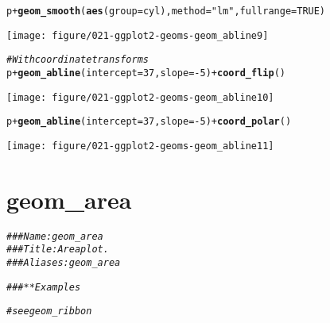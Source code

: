 \documentclass[a4paper,titlepage]{tufte-handout}\usepackage[]{graphicx}\usepackage[]{color}
\makeatletter
\def\maxwidth{ %
  \ifdim\Gin@nat@width>\linewidth
    \linewidth
  \else
    \Gin@nat@width
  \fi
}
\newcommand{\hlnum}[1]{\textcolor[rgb]{0.686,0.059,0.569}{#1}}%
\newcommand{\hlstr}[1]{\textcolor[rgb]{0.192,0.494,0.8}{#1}}%
\newcommand{\hlcom}[1]{\textcolor[rgb]{0.678,0.584,0.686}{\textit{#1}}}%
\newcommand{\hlopt}[1]{\textcolor[rgb]{0,0,0}{#1}}%
\newcommand{\hlstd}[1]{\textcolor[rgb]{0.345,0.345,0.345}{#1}}%
\newcommand{\hlkwc}[1]{\textcolor[rgb]{0.333,0.667,0.333}{#1}}%
\newcommand{\hlkwd}[1]{\textcolor[rgb]{0.737,0.353,0.396}{\textbf{#1}}}%
\newenvironment{kframe}{%
 \def\at@end@of@kframe{}%
 \ifinner\ifhmode%
  \def\at@end@of@kframe{\end{minipage}}%
  \begin{minipage}{\columnwidth}%
 \fi\fi%
 \def\FrameCommand##1{\hskip\@totalleftmargin \hskip-\fboxsep
 \colorbox{shadecolor}{##1}\hskip-\fboxsep
     \hskip-\linewidth \hskip-\@totalleftmargin \hskip\columnwidth}%
 \MakeFramed {\advance\hsize-\width
   \@totalleftmargin\z@ \linewidth\hsize
   \@setminipage}}%
 {\par\unskip\endMakeFramed%
 \at@end@of@kframe}
\newenvironment{knitrout}{}{} %
\makeatother
\begin{document}
\begin{knitrout}
\begin{kframe}
\begin{alltt}
\hlstd{p} \hlopt{+} \hlkwd{geom_smooth}\hlstd{(}\hlkwd{aes}\hlstd{(}\hlkwc{group}\hlstd{=cyl),} \hlkwc{method}\hlstd{=}\hlstr{"lm"}\hlstd{,} \hlkwc{fullrange}\hlstd{=}\hlnum{TRUE}\hlstd{)}
\end{alltt}
\end{kframe}
\texttt{[image: figure/021-ggplot2-geoms-geom\_abline9]} 
\begin{kframe}\begin{alltt}
\hlcom{# With coordinate transforms}
\hlstd{p} \hlopt{+} \hlkwd{geom_abline}\hlstd{(}\hlkwc{intercept} \hlstd{=} \hlnum{37}\hlstd{,} \hlkwc{slope} \hlstd{=} \hlopt{-}\hlnum{5}\hlstd{)} \hlopt{+} \hlkwd{coord_flip}\hlstd{()}
\end{alltt}
\end{kframe}
\texttt{[image: figure/021-ggplot2-geoms-geom\_abline10]} 
\begin{kframe}\begin{alltt}
\hlstd{p} \hlopt{+} \hlkwd{geom_abline}\hlstd{(}\hlkwc{intercept} \hlstd{=} \hlnum{37}\hlstd{,} \hlkwc{slope} \hlstd{=} \hlopt{-}\hlnum{5}\hlstd{)} \hlopt{+} \hlkwd{coord_polar}\hlstd{()}
\end{alltt}
\end{kframe}
\texttt{[image: figure/021-ggplot2-geoms-geom\_abline11]} 
\begin{kframe}\begin{alltt}


\end{alltt}
\end{kframe}
\end{knitrout}



\section{geom\_area}

\begin{knitrout}
\color{fgcolor}\begin{kframe}
\begin{alltt}
\hlcom{### Name: geom_area}
\hlcom{### Title: Area plot.}
\hlcom{### Aliases: geom_area}

\hlcom{### ** Examples}

\hlcom{# see geom_ribbon}
\end{alltt}
\end{kframe}
\end{knitrout}
\end{document}
